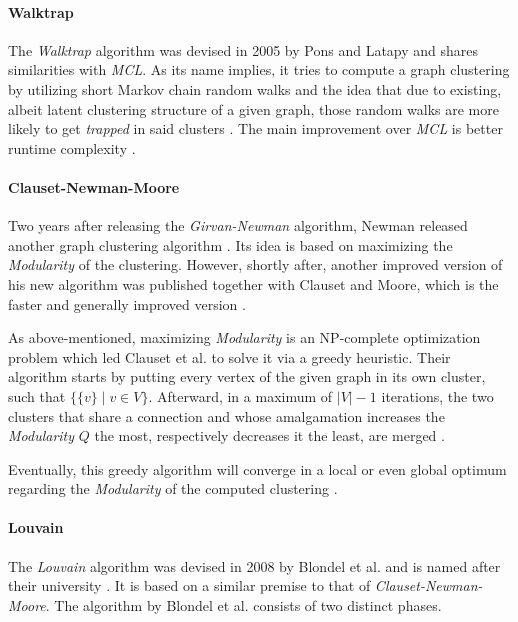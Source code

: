 \documentclass[12pt,a4paper]{report}
\begin{document}
\paragraph{Walktrap \cite{pons2005computing}}
The \textit{Walktrap} algorithm
was devised in 2005 by Pons and Latapy \cite{pons2005computing} and shares
similarities with \textit{MCL}. As its name implies, it tries to compute a
graph clustering by utilizing short Markov chain random walks and the idea that
due to existing, albeit latent clustering structure of a given graph, those
random walks are more likely to get \textit{trapped} in said clusters \cite{
pons2005computing}. The main improvement over \textit{MCL} is better runtime
complexity \cite{pons2005computing}.

\paragraph{Clauset-Newman-Moore \cite{clauset2004modularity}}
Two years after
releasing the \textit{Girvan-Newman} algorithm, Newman released another graph
clustering algorithm \cite{newman2004fast}. Its idea is based on maximizing the
\textit{Modularity} of the clustering. However, shortly after, another improved
version of his new algorithm was published together with Clauset and Moore,
which is the faster and generally improved version \cite{clauset2004modularity}.

As above-mentioned, maximizing \textit{Modularity} is an NP-complete
optimization problem which led Clauset et al. to solve it via a greedy
heuristic. Their algorithm starts by putting every vertex of the given graph in
its own cluster, such that \(\{\{v\} \mid v \in V\}\). Afterward, in a maximum
of \(\vert V \vert - 1\) iterations, the two clusters that share a connection
and whose amalgamation increases the \textit{Modularity} \(Q\) the most,
respectively decreases it the least, are merged \cite{clauset2004modularity}.

Eventually, this greedy algorithm will converge in a local or even global
optimum regarding the \textit{Modularity} of the computed clustering
\cite{clauset2004modularity}.

\paragraph{Louvain \cite{blondel2008modularity}}
The \textit{Louvain} algorithm
was devised in 2008 by Blondel et al. and is named after their university
\cite{blondel2008modularity}. It is based on a similar premise to that of
\textit{Clauset-Newman-Moore}.
The algorithm by Blondel et al. consists of two distinct phases.
\end{document}
